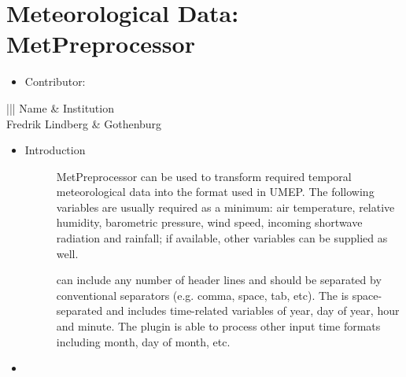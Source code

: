 \documentclass[letterpaper,10pt,english]{sphinxmanual}
\begin{document}
\section{Meteorological Data: MetPreprocessor}
\label{\detokenize{pre-processor/Meteorological Data MetPreprocessor:meteorological-data-metpreprocessor}}\label{\detokenize{pre-processor/Meteorological Data MetPreprocessor:metpreprocessor}}\label{\detokenize{pre-processor/Meteorological Data MetPreprocessor::doc}}\begin{itemize}
\item {} 
Contributor:

\end{itemize}


\begin{savenotes}\sphinxattablestart
\centering
\begin{tabular}[t]{|||}
\hline
\sphinxstyletheadfamily 
Name
&\sphinxstyletheadfamily 
Institution
\\
\hline
Fredrik Lindberg
&
Gothenburg
\\
\hline
\end{tabular}
\par
\sphinxattableend\end{savenotes}
\begin{itemize}
\item {} \begin{description}
\item[{Introduction}] \leavevmode
MetPreprocessor can be used to transform required temporal meteorological data into the format used in UMEP. The following variables are usually required as a minimum: air temperature, relative humidity, barometric pressure, wind speed, incoming shortwave radiation and rainfall; if available, other variables can be supplied as well.

 can include any number of header lines and should be separated by conventional separators (e.g. comma, space, tab, etc). The  is space-separated and includes time-related variables of year, day of year, hour and minute. The plugin is able to process other input time formats including month, day of month, etc.

\end{description}

\item {} 

\end{itemize}
\end{document}
